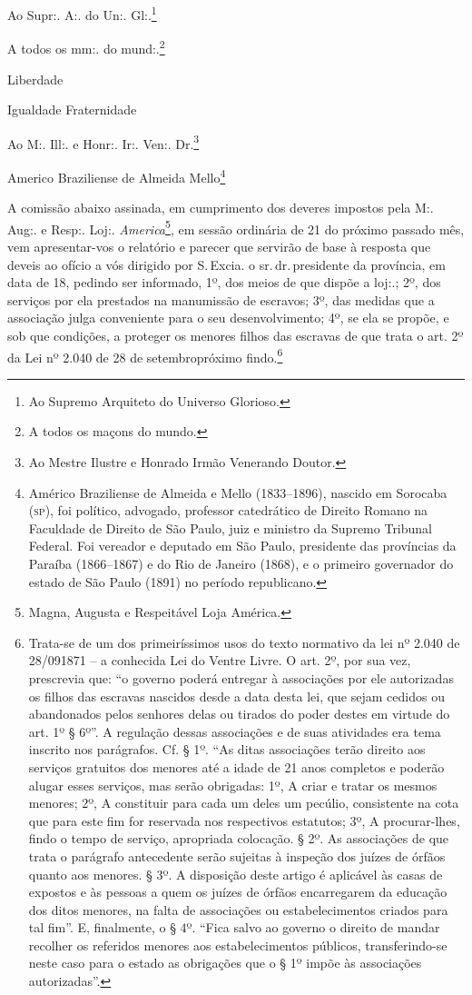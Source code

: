 Ao Supr:. A:. do Un:. Gl:.\footnote{ Ao Supremo Arquiteto do Universo
  Glorioso.}

A todos os mm:. do mund:.\footnote{ A todos os maçons do mundo.}

Liberdade

Igualdade Fraternidade

Ao M:. Ill:. e Honr:. Ir:. Ven:. Dr.\footnote{ Ao Mestre Ilustre e
  Honrado Irmão Venerando Doutor.}

Americo Braziliense de Almeida Mello\footnote{ Américo Braziliense de
  Almeida e Mello (1833--1896), nascido em Sorocaba (\textsc{sp}), foi político,
  advogado, professor catedrático de Direito Romano na Faculdade de
  Direito de São Paulo, juiz e ministro da Supremo Tribunal Federal. Foi
  vereador e deputado em São Paulo, presidente das províncias da Paraíba
  (1866--1867) e do Rio de Janeiro (1868), e o primeiro governador do
  estado de São Paulo (1891) no período republicano.}

A comissão abaixo assinada, em cumprimento dos deveres impostos pela M:.
Aug:. e Resp:. Loj:. \emph{America}\footnote{ Magna, Augusta e
  Respeitável Loja América.}, em sessão ordinária de 21 do próximo
passado mês, vem apresentar-vos o relatório e parecer que servirão de
base à resposta que deveis ao ofício a vós dirigido por S.\,Excia. o sr.\,dr.\,presidente da província, em data de 18, pedindo ser informado, 1º,
dos meios de que dispõe a loj:.; 2º, dos serviços por ela prestados na
manumissão de escravos; 3º, das medidas que a associação julga
conveniente para o seu desenvolvimento; 4º, se ela se propõe, e sob que
condições, a proteger os menores filhos das escravas de que trata o art.
2º da Lei nº 2.040 de 28 de setembropróximo findo.\footnote{ Trata-se
  de um dos primeiríssimos usos do texto normativo da lei nº 2.040 de
  28/091871 -- a conhecida Lei do Ventre Livre. O art. 2º, por sua vez,
  prescrevia que: ``o governo poderá entregar à associações por ele
  autorizadas os filhos das escravas nascidos desde a data desta lei,
  que sejam cedidos ou abandonados pelos senhores delas ou tirados do
  poder destes em virtude do art. 1º § 6º''. A regulação dessas
  associações e de suas atividades era tema inscrito nos parágrafos. Cf.
  § 1º. ``As ditas associações terão direito aos serviços gratuitos dos
  menores até a idade de 21 anos completos e poderão alugar esses
  serviços, mas serão obrigadas: 1º, A criar e tratar os mesmos menores;
  2º, A constituir para cada um deles um pecúlio, consistente na cota
  que para este fim for reservada nos respectivos estatutos; 3º, A
  procurar-lhes, findo o tempo de serviço, apropriada colocação. § 2º.
  As associações de que trata o parágrafo antecedente serão sujeitas à
  inspeção dos juízes de órfãos quanto aos menores. § 3º. A disposição
  deste artigo é aplicável às casas de expostos e às pessoas a quem os
  juízes de órfãos encarregarem da educação dos ditos menores, na falta
  de associações ou estabelecimentos criados para tal fim''. E,
  finalmente, o § 4º. ``Fica salvo ao governo o direito de mandar
  recolher os referidos menores aos estabelecimentos públicos,
  transferindo-se neste caso para o estado as obrigações que o § 1º
  impõe às associações autorizadas''.}


